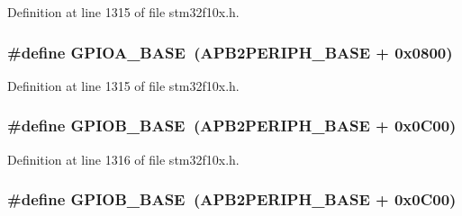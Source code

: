 Definition at line 1315 of file stm32f10x.\+h.

\subsubsection[{\texorpdfstring{G\+P\+I\+O\+A\+\_\+\+B\+A\+SE}{GPIOA_BASE}}]{\setlength{\rightskip}{0pt plus 5cm}\#define G\+P\+I\+O\+A\+\_\+\+B\+A\+SE~({\bf A\+P\+B2\+P\+E\+R\+I\+P\+H\+\_\+\+B\+A\+SE} + 0x0800)}\hypertarget{group___peripheral__memory__map_gad7723846cc5db8e43a44d78cf21f6efa}{}\label{group___peripheral__memory__map_gad7723846cc5db8e43a44d78cf21f6efa}


Definition at line 1315 of file stm32f10x.\+h.

\subsubsection[{\texorpdfstring{G\+P\+I\+O\+B\+\_\+\+B\+A\+SE}{GPIOB_BASE}}]{\setlength{\rightskip}{0pt plus 5cm}\#define G\+P\+I\+O\+B\+\_\+\+B\+A\+SE~({\bf A\+P\+B2\+P\+E\+R\+I\+P\+H\+\_\+\+B\+A\+SE} + 0x0\+C00)}\hypertarget{group___peripheral__memory__map_gac944a89eb789000ece920c0f89cb6a68}{}\label{group___peripheral__memory__map_gac944a89eb789000ece920c0f89cb6a68}


Definition at line 1316 of file stm32f10x.\+h.

\subsubsection[{\texorpdfstring{G\+P\+I\+O\+B\+\_\+\+B\+A\+SE}{GPIOB_BASE}}]{\setlength{\rightskip}{0pt plus 5cm}\#define G\+P\+I\+O\+B\+\_\+\+B\+A\+SE~({\bf A\+P\+B2\+P\+E\+R\+I\+P\+H\+\_\+\+B\+A\+SE} + 0x0\+C00)}\hypertarget{group___peripheral__memory__map_gac944a89eb789000ece920c0f89cb6a68}{}\label{group___peripheral__memory__map_gac944a89eb789000ece920c0f89cb6a68}


